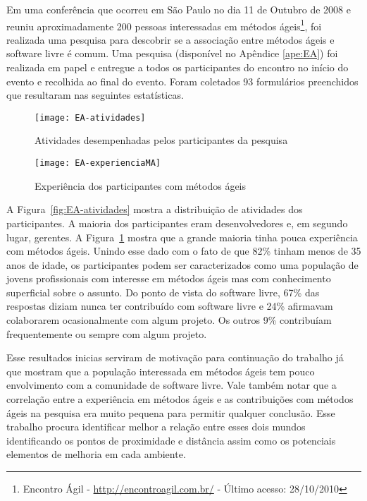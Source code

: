 Em uma conferência que ocorreu em São Paulo no dia 11 de Outubro de
2008 e reuniu aproximadamente 200 pessoas interessadas em métodos
ágeis\footnote{Encontro Ágil - \url{http://encontroagil.com.br/} -
  Último acesso: 28/10/2010}, foi realizada uma pesquisa para
descobrir se a associação entre métodos ágeis e software livre é
comum. Uma pesquisa (disponível no Apêndice \ref{ape:EA}) foi
realizada em papel e entregue a todos os participantes do encontro no
início do evento e recolhida ao final do evento. Foram coletados 93
formulários preenchidos que resultaram nas seguintes estatísticas.

\begin{figure}[htb]
  \begin{minipage}[t]{0.5\linewidth}
    \centering
    \texttt{[image: EA-atividades]}
    \caption{Atividades desempenhadas pelos participantes da pesquisa}
    \label{fig:EA-atividades}
  \end{minipage}
  \begin{minipage}[t]{0.5\linewidth}
    \centering
    \texttt{[image: EA-experienciaMA]}
    \caption{Experiência dos participantes com métodos ágeis}
    \label{fig:EA-experienciaMA}
  \end{minipage}
\end{figure}

A Figura~\ref{fig:EA-atividades} mostra a distribuição de atividades
dos participantes. A maioria dos participantes eram desenvolvedores e,
em segundo lugar, gerentes. A Figura~\ref{fig:EA-experienciaMA} mostra
que a grande maioria tinha pouca experiência com métodos ágeis. Unindo
esse dado com o fato de que 82\% tinham menos de 35 anos de idade, os
participantes podem ser caracterizados como uma população de jovens
profissionais com interesse em métodos ágeis mas com conhecimento
superficial sobre o assunto. Do ponto de vista do software livre, 67\%
das respostas diziam nunca ter contribuído com software livre e 24\%
afirmavam colaborarem ocasionalmente com algum projeto. Os outros 9\%
contribuíam frequentemente ou sempre com algum projeto.

Esse resultados inicias serviram de motivação para continuação do
trabalho já que mostram que a população interessada em métodos ágeis
tem pouco envolvimento com a comunidade de software livre. Vale também
notar que a correlação entre a experiência em métodos ágeis e as
contribuições com métodos ágeis na pesquisa era muito pequena para
permitir qualquer conclusão. Esse trabalho procura identificar melhor
a relação entre esses dois mundos identificando os pontos de
proximidade e distância assim como os potenciais elementos de melhoria
em cada ambiente.

